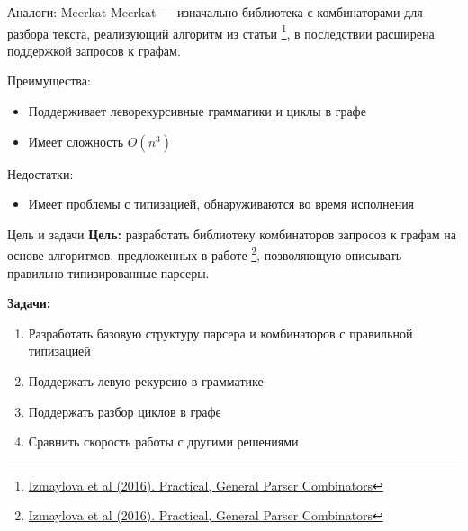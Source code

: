 \documentclass[aspectratio=169]{beamer}
\begin{document}
\begin{frame}{Аналоги: Meerkat}
  Meerkat --- изначально библиотека с комбинаторами для разбора текста, реализующий алгоритм из статьи \footnote[1]{\href{https://dl.acm.org/doi/10.1145/2847538.2847539}
    {Izmaylova et al (2016). Practical, General Parser Combinators}}, в последствии расширена поддержкой запросов к графам.

  Преимущества:
  \begin{itemize}
    \item Поддерживает леворекурсивные грамматики и циклы в графе
    \item Имеет сложность $O(n^3)$
  \end{itemize}
  Недостатки:
  \begin{itemize}
    \item Имеет проблемы с типизацией, обнаруживаются во время исполнения
  \end{itemize}
\end{frame}


\begin{frame}{Цель и задачи}
  \textbf{Цель:} разработать библиотеку комбинаторов запросов к графам на основе алгоритмов, предложенных в работе \footnote[1]{\href{https://dl.acm.org/doi/10.1145/2847538.2847539}
    {Izmaylova et al (2016). Practical, General Parser Combinators}}, позволяющую описывать правильно типизированные парсеры.

  \textbf{Задачи:}
  \begin{enumerate}
    \item Разработать базовую структуру парсера и комбинаторов с правильной типизацией
    \item Поддержать левую рекурсию в грамматике
    \item Поддержать разбор циклов в графе
    \item Сравнить скорость работы с другими решениями
  \end{enumerate}
\end{frame}
\end{document}
